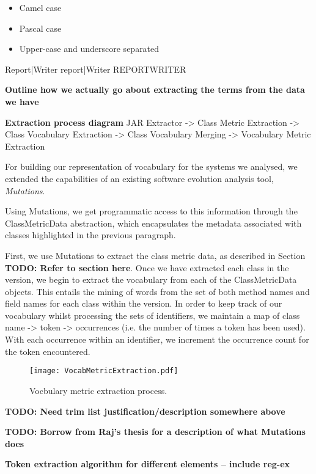 \begin{itemize}
	\item Camel case
	\item Pascal case
	\item Upper-case and underscore separated
\end{itemize}

Report|Writer
report|Writer
REPORTWRITER

\textbf{Outline how we actually go about extracting the terms from the data we have}

\textbf{Extraction process diagram}
JAR Extractor -> Class Metric Extraction -> Class Vocabulary Extraction -> Class Vocabulary Merging -> Vocabulary Metric Extraction

For building our representation of vocabulary for the systems we analysed, we extended the capabilities of an existing software evolution analysis tool, \emph{Mutations}.

Using Mutations, we get programmatic access to this information through the ClassMetricData abstraction, which encapsulates the metadata associated with classes highlighted in the previous paragraph.

First, we use Mutations to extract the class metric data, as described in Section \textbf{TODO: Refer to section here}. Once we have extracted each class in the version, we begin to extract the vocabulary from each of the ClassMetricData objects. This entails the mining of words from the set of both method names and field names for each class within the version. In order to keep track of our vocabulary whilst processing the sets of identifiers, we maintain a map of class name -> token -> occurrences (i.e. the number of times a token has been used). With each occurrence within an identifier, we increment the occurrence count for the token encountered.

\begin{figure}[t]
	\texttt{[image: VocabMetricExtraction.pdf]}
	\caption{Vocbulary metric extraction process.}
	\label{fig:VocabMetricExtraction}
\end{figure}

\textbf{TODO: Need trim list justification/description somewhere above}

\textbf{TODO: Borrow from Raj's thesis for a description of what Mutations does}

\textbf{Token extraction algorithm for different elements -- include reg-ex}

